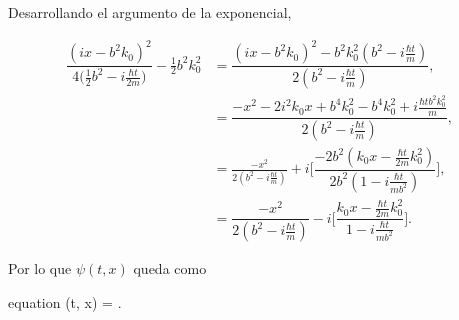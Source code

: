 \documentclass[../main.tex]{subfiles}
\begin{document}
\begin{problema}
	Desarrollando el argumento de la exponencial,

	\begin{align*}
		\dfrac{(ix - b^{2}k_{0})^{2}}{4 \bigl(\tfrac{1}{2}b^{2} - i\tfrac{\hbar t}{2m}\bigr)} - \tfrac{1}{2}b^{2}k_{0}^{2} & = \dfrac{(ix - b^{2}k_{0})^{2} -b^{2}k_{0}^{2}(b^{2} - i\tfrac{\hbar t}{m})}{2(b^{2} - i\tfrac{\hbar t}{m})},                                                    \\
		                                                                                                                   & = \dfrac{-x^{2} - 2i^{2}k_{0}x + b^{4}k_{0}^{2} - b^{4}k_{0}^{2} + i\tfrac{\hbar t b^{2}k_{0}^{2}}{m}}{2(b^{2} - i\tfrac{\hbar t}{m})},                          \\
		                                                                                                                   & = \tfrac{-x^{2}}{2(b^{2} - i\tfrac{\hbar t}{m})} + i \Biggl[\dfrac{-2b^{2}(k_{0}x - \tfrac{\hbar t}{2m}k_{0}^{2})}{2b^{2}(1 - i\tfrac{\hbar t}{mb^{2}})}\Biggr], \\
		                                                                                                                   & = \dfrac{-x^{2}}{2(b^{2} - i\tfrac{\hbar t}{m})} - i \Biggl[\dfrac{k_{0}x - \tfrac{\hbar t}{2m}k_{0}^{2}}{1 - i\tfrac{\hbar t}{mb^{2}}}\Biggr].
	\end{align*}

	Por lo que \(\psi(t, x)\) queda como

	\begin{empheq}[box = \mainresult]{equation}
		\psi(t, x) = 
		\exp{}
		\exp{}.
		\label{eq:wave-packet-res}
	\end{empheq}
\end{problema}
\end{document}
